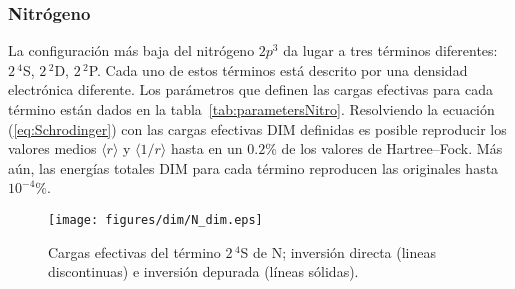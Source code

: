 \subsubsection*{Nitrógeno}

La configuración más baja del nitrógeno $2p^3$ da lugar a tres términos
diferentes: $2\,^4$S, $2\,^2$D, $2\,^2$P. Cada uno de estos términos 
está descrito por una densidad electrónica diferente. Los parámetros 
que definen las cargas efectivas para cada término están dados en la 
tabla~\ref{tab:parametersNitro}. Resolviendo la ecuación (\ref{eq:Schrodinger}) 
con las cargas efectivas DIM definidas es posible reproducir los valores 
medios $\langle r \rangle$ y $\langle 1/r \rangle$ hasta en un $0.2\%$ 
de los valores de Hartree--Fock. Más aún, las energías totales DIM para 
cada término reproducen las originales hasta $10^{-4}\%$. 

\begin{figure}
\centering
\texttt{[image: figures/dim/N\_dim.eps]}
\caption[Cargas efectivas DIM de nitrógeno.]
{Cargas efectivas del término $2\,^4$S de N; 
inversión directa (lineas discontinuas) 
e inversión depurada (líneas sólidas).}
\label{fig:Nzeff}
\end{figure}

